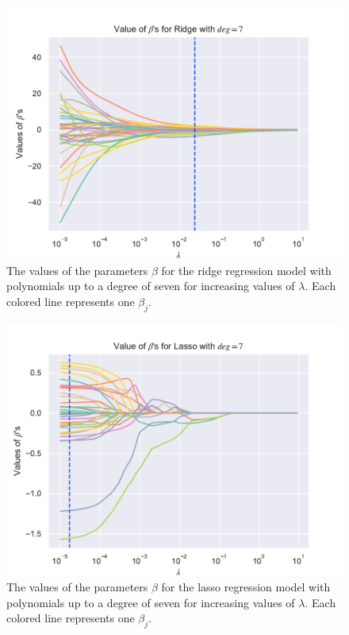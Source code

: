 \begin{figure}[h!]
    \centering
    \includegraphics[width=1\linewidth]{project_1_alt/figures/figures_in_report/Ridge_Betas_lambda_Franke_Noise_const_deg.pdf}
    \caption{The values of the parameters $\beta$ for the ridge regression model with polynomials up to a degree of seven for increasing values of $\lambda$. Each colored line represents one $\beta_j$.}
    \label{fig:ridge_betas}
\end{figure}

\begin{figure}[h!]
    \centering
    \includegraphics[width=1\linewidth]{project_1_alt/figures/figures_in_report/lasso_Betas_lambda_Franke_Noise_const_deg.pdf}
    \caption{The values of the parameters $\beta$ for the lasso regression model with polynomials up to a degree of seven for increasing values of $\lambda$. Each colored line represents one $\beta_j$.}
    \label{fig:lasso_betas}
\end{figure}


